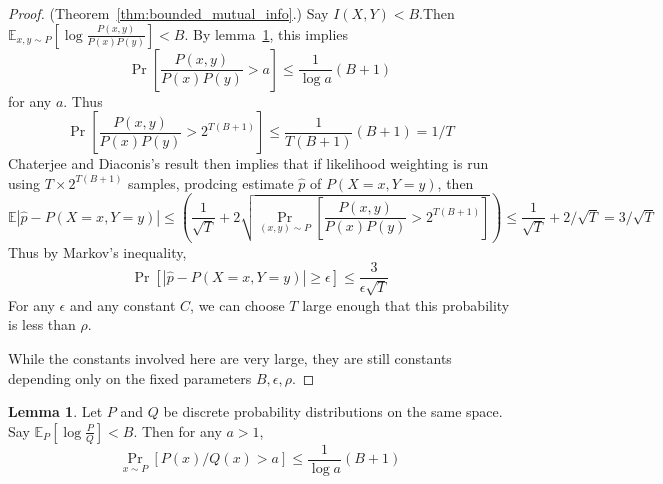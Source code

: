 \documentclass{article}
\theoremstyle{definition}
\newtheorem{lem}[thm]{Lemma}
\theoremstyle{remark}
\begin{document}
\begin{proof}{(Theorem~\ref{thm:bounded_mutual_info}.)}
Say $I(X, Y) < B$.Then
$\mathbb{E}_{x, y \sim P}[\log \frac{P(x, y)}{P(x)P(y)}] < B$.
By lemma~\ref{lem:pqbound},
this implies
$$
\Pr[\frac{P(x, y)}{P(x)P(y)} > a] \leq \frac{1}{\log a}(B + 1)
$$
for any $a$. Thus
$$
\Pr[\frac{P(x, y)}{P(x)P(y)} > 2^{T(B + 1)}] \leq \frac{1}{T(B + 1)}(B + 1) = 1/T
$$
Chaterjee and Diaconis's result then implies that if 
likelihood weighting is run using $T \times 2^{T(B + 1)}$ samples,
prodcing estimate $\hat{p}$ of $P(X = x, Y = y)$,
then
$$
\mathbb{E}|\hat{p} - P(X = x, Y = y)| \leq (\frac{1}{\sqrt{T}} + 2 \sqrt{\Pr_{(x, y) \sim P}[\frac{P(x, y)}{P(x)P(y)} > 2^{T(B + 1)}]}) \leq \frac{1}{\sqrt{T}} + 2/\sqrt{T} = 3/\sqrt{T}
$$
Thus by Markov's inequality,
$$
\Pr [|\hat{p} - P(X = x, Y = y)| \geq \epsilon] \leq \frac{3}{\epsilon \sqrt{T}}
$$
For any $\epsilon$ and any constant $C$, we can choose $T$ large enough that this probability is less than $\rho$.

While the constants involved here are very large, they are still constants depending only on the fixed parameters $B, \epsilon, \rho$.

\end{proof}

\begin{lem} \label{lem:pqbound}
Let $P$ and $Q$ be discrete probability distributions on the same space.
Say $\mathbb{E}_{P}[\log \frac{P}{Q}] < B$.
Then for any $a > 1$,
$$
\Pr_{x \sim P}[P(x)/Q(x) > a] \leq \frac{1}{\log a}(B + 1)
$$
\end{lem}
\end{document}
